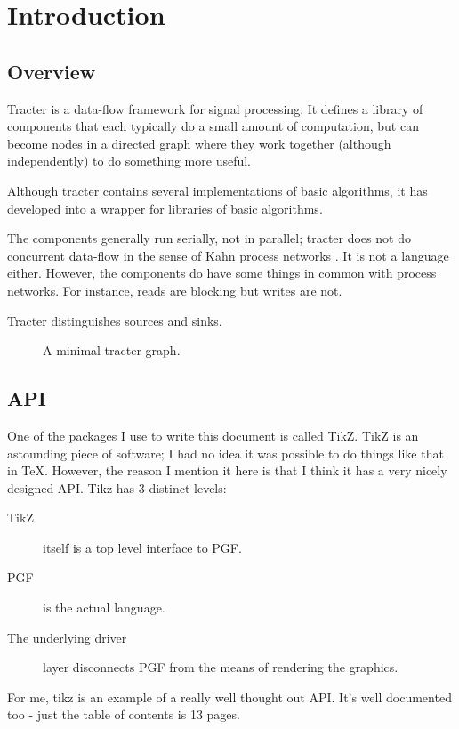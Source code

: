 \section{Introduction}
\subsection{Overview}

Tracter is a data-flow framework for signal processing.  It defines a
library of components that each typically do a small amount of
computation, but can become nodes in a directed graph where they work
together (although independently) to do something more useful.

Although tracter contains several implementations of basic algorithms,
it has developed into a wrapper for libraries of basic algorithms.

The components generally run serially, not in parallel; tracter does
not do concurrent data-flow in the sense of Kahn process networks
\citep{Lee1995}.  It is not a language either.  However, the
components do have some things in common with process networks.  For
instance, reads are blocking but writes are not.

Tracter distinguishes sources and sinks.

\begin{figure}[h]
  \centering
  \caption{A minimal tracter graph.}
  \label{fig:Graph}
\end{figure}


\subsection{API}

One of the packages I use to write this document is called TikZ.  TikZ
is an astounding piece of software; I had no idea it was possible to
do things like that in \TeX.  However, the reason I mention it here is
that I think it has a very nicely designed API.  Tikz has 3 distinct
levels:
\begin{description}
\item[TikZ] itself is a top level interface to PGF.
\item[PGF] is the actual language.
\item[The underlying driver] layer disconnects PGF from the means of
  rendering the graphics.
\end{description}
For me, tikz is an example of a really well thought out API.  It's
well documented too - just the table of contents is 13 pages.


